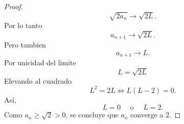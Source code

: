 \documentclass[12pt,a4paper]{article}
\begin{document}
\begin{proof}
\begin{equation*}
            \sqrt{2a_{n}}\to\sqrt{2L}.
        \end{equation*}
        Por lo tanto
        \begin{equation*}
            a_{n+1}\to\sqrt{2L}.
        \end{equation*}
        Pero tambien
        \begin{equation*}
            a_{n+1}\to L.
        \end{equation*}
        Por unicidad del limite
        \begin{equation*}
            L=\sqrt{2L}
        \end{equation*}
        Elevando al cuadrado
        \begin{equation*}
            L^{2}=2L\Longleftrightarrow L(L-2)=0.
        \end{equation*}
        Así,
        \begin{equation*}
            L=0 \quad\text{ o }\quad L=2.
        \end{equation*}
        Como $a_{n}\geq\sqrt{2}\gt0$, se concluye que $a_{n}$ converge
        a 2.
    \end{proof}
\end{document}
